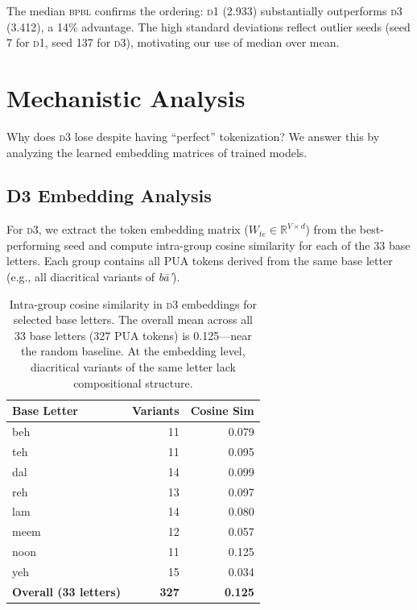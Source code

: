 \documentclass[11pt]{article}
\newcommand{\dOne}{\textsc{d1}}
\newcommand{\dThree}{\textsc{d3}}
\newcommand{\bpbl}{\textsc{bpbl}}
\begin{document}
The median \bpbl{} confirms the ordering: \dOne{} (2.933) substantially outperforms \dThree{} (3.412), a 14\% advantage.
The high standard deviations reflect outlier seeds (seed 7 for \dOne{}, seed 137 for \dThree{}), motivating our use of median over mean.

\section{Mechanistic Analysis}
\label{sec:mechanistic}

Why does \dThree{} lose despite having ``perfect'' tokenization?
We answer this by analyzing the learned embedding matrices of trained models.

\subsection{D3 Embedding Analysis}

For \dThree{}, we extract the token embedding matrix ($W_{te} \in \mathbb{R}^{V \times d}$) from the best-performing seed and compute intra-group cosine similarity for each of the 33 base letters.
Each group contains all PUA tokens derived from the same base letter (e.g., all diacritical variants of \emph{b\={a}'}).

\begin{table}[t]
\centering
\small
\begin{tabular}{@{}lrr@{}}
\toprule
\textbf{Base Letter} & \textbf{Variants} & \textbf{Cosine Sim} \\
\midrule
beh & 11 & 0.079 \\
teh & 11 & 0.095 \\
dal & 14 & 0.099 \\
reh & 13 & 0.097 \\
lam & 14 & 0.080 \\
meem & 12 & 0.057 \\
noon & 11 & 0.125 \\
yeh & 15 & 0.034 \\
\midrule
\textbf{Overall (33 letters)} & \textbf{327} & \textbf{0.125} \\
\bottomrule
\end{tabular}
\caption{Intra-group cosine similarity in \dThree{} embeddings for selected base letters. The overall mean across all 33 base letters (327 PUA tokens) is 0.125---near the random baseline. At the embedding level, diacritical variants of the same letter lack compositional structure.}
\label{tab:d3_cosine}
\end{table}
\end{document}
